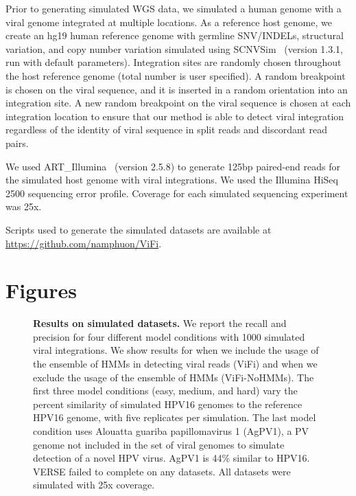 \documentclass[12pt]{article}
\begin{document}
Prior to generating simulated WGS data, we simulated a human genome with a viral genome integrated at multiple locations. As a reference host genome, we create an hg19 human reference genome with germline SNV/INDELs, structural variation, and copy number variation simulated using SCNVSim~\cite{Qin2015} (version 1.3.1, run with default parameters). Integration sites are randomly chosen throughout the host reference genome (total number is user specified). A random breakpoint is chosen on the viral sequence, and it is inserted in a random orientation into an integration site. A new random breakpoint on the viral sequence is chosen at each integration location to ensure that our method is able to detect viral integration regardless of the identity of viral sequence in split reads and discordant read pairs.

We used ART\_Illumina~\cite{Huang2012} (version 2.5.8) to generate 125bp paired-end reads for the simulated host genome with viral integrations. We used the Illumina HiSeq 2500 sequencing error profile. Coverage for each simulated sequencing experiment was 25x.

Scripts used to generate the simulated datasets are available at \url{https://github.com/namphuon/ViFi}.
    
\section{Figures}

\begin{figure}[htpb]
  \centering
\caption[Results on simulated datasets with 1000 integrations.]
{\label{sim_results_1000}  {\bf Results on simulated datasets.}  We report the recall and precision for four different model conditions with 1000 simulated viral integrations.  We show results for when we include the usage of the  ensemble of HMMs in detecting viral reads (ViFi) and when we exclude the usage of the ensemble of HMMs (ViFi-NoHMMs).  The first three model conditions (easy, medium, and hard) vary the percent similarity of simulated HPV16 genomes to the reference HPV16 genome, with five replicates per simulation.  The last model condition uses Alouatta guariba papillomavirus 1 (AgPV1), a PV genome not included in the set of viral genomes to simulate detection of a novel HPV virus.  AgPV1 is 44\% similar to HPV16.  VERSE failed to complete on any datasets.  All datasets were simulated with 25x coverage.}
\end{figure}
\end{document}
